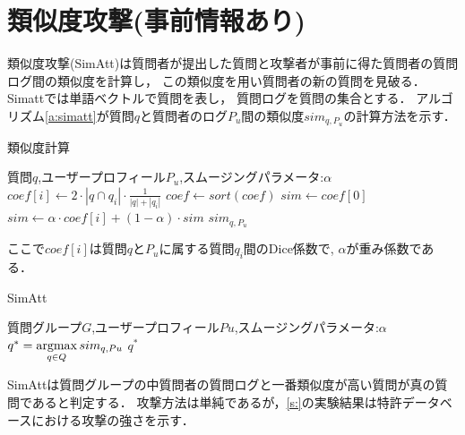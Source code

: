 \documentclass[master]{suribt}
\theoremstyle{definition}
\newcommand{\argmax}{\mathop{\rm argmax}\limits}
\begin{document}

 \section{類似度攻撃(事前情報あり)}
 類似度攻撃(SimAtt)\cite{simattack2016}は質問者が提出した質問と攻撃者が事前に得た質問者の質問ログ間の類似度を計算し，
 この類似度を用い質問者の新の質問を見破る．
 Simattでは単語ベクトルで質問を表し，
 質問ログを質問の集合とする．
 アルゴリズム\ref{a:simatt}が質問$q$と質問者のログ$P_u$間の類似度$sim_{q,P_u}$の計算方法を示す．

 \begin{algorithm}
 \caption{類似度計算}
 \begin{algorithmic}[1]
  \Require 質問$q$,ユーザープロフィール$P_u$,スムージングパラメータ:$\alpha$
  \State $coef[i] \leftarrow 2 \cdot |q \cap q_i| \cdot \frac{1}{|q|+|q_i|}$
  \EndFor
  \State $coef \gets sort(coef)$
  \State $sim \gets coef[0]$
  \State $sim \gets \alpha \cdot coef[i] + (1 - \alpha) \cdot sim$
  \EndFor
  \Ensure $sim_{q,P_u}$
 \end{algorithmic}
 \label{a:simatt}
 \end{algorithm}

 ここで$coef[i]$は質問$q$と$P_u$に属する質問$q_i$間のDice係数\cite{}で,
 $\alpha$が重み係数である．
  
 \begin{algorithm}
 \caption{SimAtt}
 \begin{algorithmic}[1]
   \Require 質問グループ$G$,ユーザープロフィール$Pu$,スムージングパラメータ:$\alpha$
   \State $q^* = \argmax_{q \in Q}sim_{q,Pu}$
   \Ensure $q^*$
 \end{algorithmic}
 \end{algorithm}

 SimAttは質問グループの中質問者の質問ログと一番類似度が高い質問が真の質問であると判定する．
 攻撃方法は単純であるが，\ref{s:}の実験結果は特許データベースにおける攻撃の強さを示す．
\end{document}
